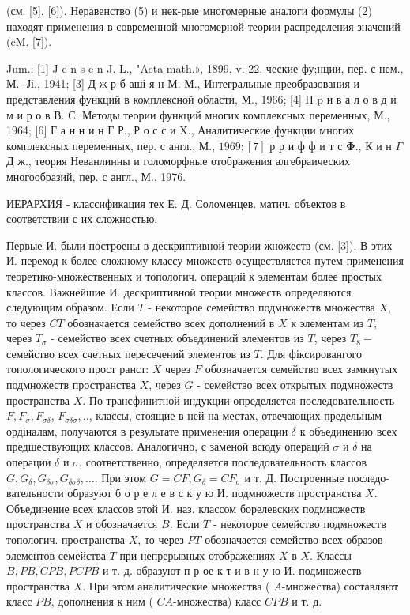 \documentclass[10pt]{article}
\begin{document}
(см. [5], [6]). Неравенство (5) и нек-рые многомерные аналоги формулы (2) находят применения в современной многомерной теории распределения значений (cM. [7]).



Jum.: [1] J e n s e n J. L., "Acta math.», 1899, v. 22, ческие фу;нции, пер. с нем., М.- Јі., 1941; [3] Д ж р б аші я н М. М., Интегральные преобразования и представления функций в комплексной области, М., 1966; [4] П p и в а л о в д и м и р о в В. С. Методы теории функций многих комплексных переменных, М., 1964; [6] Г а н н и н Г Р., Р о с с и X., Аналитические функции многих комплексных переменных, пер. с англ., М., $1969 ;[7]$ р р и ф ф и т с $\boldsymbol{\Phi} .$, К и н $\Gamma$ Д ж., теория Неванлинны и голоморфные отображения алгебраических многообразий, пер. с англ., М., 1976.



ИЕРАРХИЯ - классификация тех Е. Д. Соломенцев. матич. объектов в соответствии с их сложностью.



Первые И. были построены в дескриптивной теории жножеств (см. [3]). В этих И. переход к более сложному классу множеств осуществляется путем применения теоретико-множественных и топологич. операций к элементам более простых классов. Важнейшие И. дескриптивной теории множеств определяются следующим образом. Если $T$ - некоторое семейство подмножеств множества $X$, то через $C T$ обозначается семейство всех дополнений в $X$ к элементам из $T$, через $T_{\sigma}$ - семейство всех счетных объединений элементов из $T$, через $T_{8}-$ семейство всех счетных пересечений элементов из $T$. Для фіксировангого топологического прост ранст: $X$ через $F$ обозначается семейство всех замкнутых подмножеств пространства $X$, через $G$ - семейство всех открытых подмножеств пространства $X$. По трансфинитной индукции определяется последовательность $F, F_{\sigma}, F_{\sigma \delta}$, $F_{\sigma \delta \sigma}, . .$, классы, стоящие в ней на местах, отвечающих предельным ордіналам, получаются в результате применения операции $\delta$ к объединению всех предшествующих классов. Аналогично, с заменой всюду операций $\sigma$ и $\delta$ на операции $\delta$ и $\sigma$, соответственно, определяется последовательность классов $G, G_{\delta}, G_{\delta \sigma}, G_{\delta \sigma \delta}, \ldots$. При этом $G=C F, G_{\delta}=C F_{\sigma}$ и т. Д. Построенные последо- вательности образуют б о р е л е в с к у ю И. подмножеств пространства $X$. Объединение всех классов этой И. наз. классом борелевских подмножеств пространства $X$ и обозначается $B$. Если $T$ - некоторое семейство подмножеств топологич. пространства $X$, то через $P T$ обозначается семейство всех образов элементов семейства $T$ при непрерывных отображениях $X$ в $X$. Классы $B, P B, C P B, P C P B$ и т. д. образуют п р ое к т и в н у ю И. подмножеств пространства $X$. При этом аналитические множества ( $A$-множества) составляют класс $P B$, дополнения к ним ( $C A$-множества) класс $C P B$ и т. д.
\end{document}
